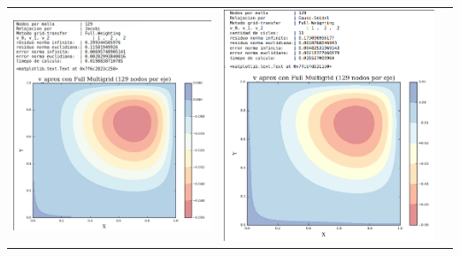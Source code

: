 \documentclass[letter,10pt]{article}
\begin{document}
\begin{table}[H]
\begin{tabular}[t]{|c|c|c|}
\includegraphics[scale=0.38]{img/fmg/mgjacobi129NFW}& \includegraphics[scale=0.35]{img/fmg/mgGS129NFW}&

\end{tabular}
\end{table}
\end{document}
